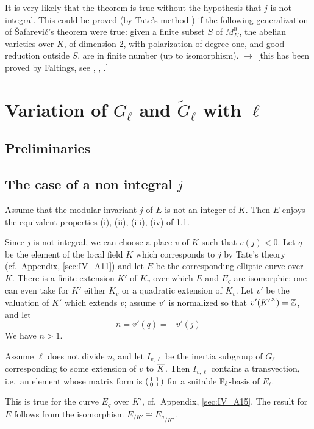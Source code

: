 \begin{obs}
It is very likely that the theorem is true without the hypothesis that $j$ is
not integral. This could be proved (by Tate's method \cite{38}) if the
following generalization of \v Safarevi\v c's theorem were true: given a finite
subset $S$ of $M_K^0$, the abelian varieties over $K$, of dimension 2, with
polarization of degree one, and good reduction outside $S$, are in finite
number (up to isomorphism). $\to$ [this has been proved by Faltings, see
\cite{54}, \cite{56}, \cite{82}.]
\end{obs}

\section{Variation of \texorpdfstring{$G_\ell$}{Gℓ} and
\texorpdfstring{$\widetilde{G}_\ell$}{Ḡℓ} with \texorpdfstring{$\ell$}{ℓ}}
\label{sec:IV_3}

\subsection{Preliminaries}
\label{sec:IV_31}

\subsection{The case of a non integral $j$}
\label{sec:IV_32}
\dpage
\begin{thm}
	Assume that the modular invariant $j$ of $E$ is not an integer of $K$.
	Then $E$ enjoys the equivalent properties (i), (ii), (iii), (iv) of
	\ref{sec:IV_31}.
\end{thm}
Since $j$ is not integral, we can choose a place $v$ of $K$ such
that $v(j) < 0$. Let $q$ be the element of the local field $K$ which
corresponds to $j$ by Tate's theory (cf.\ Appendix, \ref{sec:IV_A11}) and let $E$
be the corresponding elliptic curve over $K$. There is a finite
extension $K'$ of $K_v$ over which $E$ and $E_q$ are isomorphic; one
can even take for $K'$ either $K_v$ or a quadratic extension of $K_v$.
Let $v'$ be the valuation of $K'$ which extends $v$; assume $v'$ is
normalized so that $v'({K'}^\times) = \mathbb{Z}$, and let
\[
	n = v'(q) = - v'(j)
\]
We have $n > 1$.

\begin{lem}\label{lem:IV_32_1}
	Assume $\ell$ does not divide $n$, and let $I_{v, \ell}$ be the inertia
	subgroup of $\widetilde{G}_\ell$ corresponding to some extension of $v$
	to $\overline{K}$.  Then $I_{v, \ell}$ contains a transvection, i.e.\ an
	element whose matrix form is $
	\begin{psmallmatrix}
		1 & 1 \\
		0 & 1
	\end{psmallmatrix}
	$ for a suitable $\mathbb{F}_\ell$-basis of $E_\ell$.
\end{lem}
This is true for the curve $E_q$ over $K'$, cf.\ Appendix, \ref{sec:IV_A15}.
The result for $E$ follows from the isomorphism $E_{/K'} \cong {E_q}_{/K'}$.


